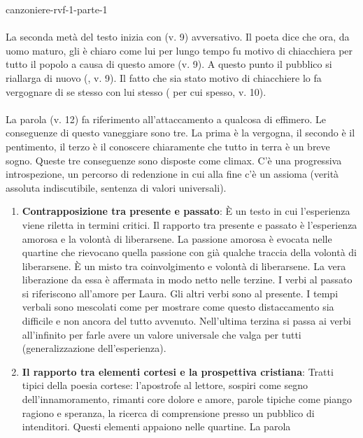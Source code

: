 \documentclass[preview]{standalone}
\begin{document}
\begin{snippet}{canzoniere-rvf-1-parte-1}
    \\\\
    La seconda metà del testo inizia con  (v. 9) avversativo.
    Il poeta dice che ora, da uomo maturo, gli è chiaro come lui per lungo tempo fu motivo
    di chiacchiera per tutto il popolo a causa di questo amore (v. 9).
    A questo punto il pubblico si riallarga di nuovo (, v. 9).
    Il fatto che sia stato motivo di chiacchiere lo fa vergognare di se stesso con lui stesso
    ( \textrightarrow per cui spesso, v. 10).
    \\\\
    La parola  (v. 12) fa riferimento all'attaccamento a qualcosa di effimero.
    Le conseguenze di questo vaneggiare sono tre.
    La prima è la vergogna, il secondo è il pentimento, il terzo è il conoscere chiaramente che tutto in
    terra è un breve sogno. Queste tre conseguenze sono disposte come climax. C'è una progressiva
    introspezione, un percorso di redenzione in cui alla fine c'è un assioma (verità assoluta indiscutibile,
    sentenza di valori universali).
    \begin{enumerate}
        \item \textbf{Contrapposizione tra presente e passato}:
            È un testo in cui l'esperienza viene riletta in termini critici. Il rapporto tra presente e passato è
            l'esperienza amorosa e la volontà di liberarsene. La passione amorosa è evocata nelle quartine che
            rievocano quella passione con già qualche traccia della volontà di liberarsene. È un misto tra
            coinvolgimento e volontà di liberarsene. La vera liberazione da essa è affermata in modo netto nelle
            terzine. I verbi al passato si riferiscono all'amore per Laura. Gli altri verbi sono al presente. I tempi
            verbali sono mescolati come per mostrare come questo distaccamento sia difficile e non ancora del
            tutto avvenuto. Nell'ultima terzina si passa ai verbi all'infinito per farle avere un valore universale
            che valga per tutti (generalizzazione dell'esperienza).
        \item \textbf{Il rapporto tra elementi cortesi e la prospettiva cristiana}:
            Tratti tipici della poesia cortese: l'apostrofe al lettore, sospiri come segno dell'innamoramento,
            rimanti core dolore e amore, parole tipiche come piango ragiono e speranza, la ricerca di
            comprensione presso un pubblico di intenditori. Questi elementi appaiono nelle quartine. La parola

\end{enumerate}
\end{snippet}
\end{document}
